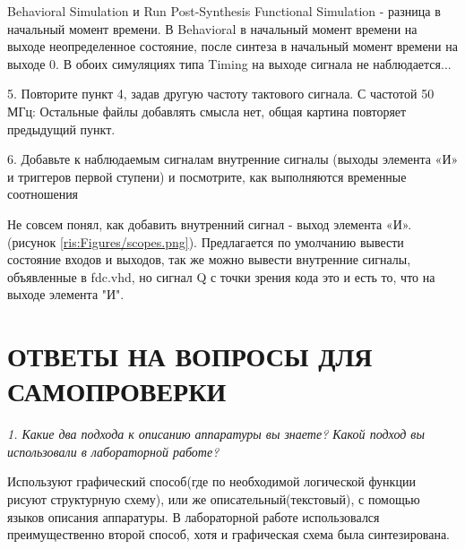 \begin{sloppypar}

Behavioral Simulation и Run Post-Synthesis Functional Simulation - разница в начальный момент времени. В Behavioral в начальный момент времени на выходе  неопределенное состояние, после синтеза в начальный момент времени на выходе 0. В обоих симуляциях типа Timing на выходе сигнала не наблюдается...

5. Повторите пункт 4, задав другую частоту тактового сигнала.
С частотой 50 МГц: 
Остальные файлы добавлять смысла нет, общая картина повторяет предыдущий пункт.

6. Добавьте к наблюдаемым сигналам внутренние сигналы (выходы элемента «И» и триггеров первой ступени) и посмотрите, как выполняются временные соотношения

Не совсем понял, как добавить  внутренний сигнал - выход элемента «И». (рисунок \ref{ris:Figures/scopes.png}). Предлагается по умолчанию вывести состояние входов и выходов, так же можно вывести внутренние сигналы, объявленные в fdc.vhd, но сигнал Q с точки зрения кода это и есть то, что на выходе элемента "И". 





\section*{ОТВЕТЫ НА ВОПРОСЫ ДЛЯ САМОПРОВЕРКИ}

\textit {1. Какие два подхода к описанию аппаратуры вы знаете? Какой подход
вы использовали в лабораторной работе?}

Используют графический способ(где по необходимой логической функции рисуют структурную схему), или же описательный(текстовый), с помощью языков описания аппаратуры. В лабораторной работе использовался преимущественно второй способ, хотя и графическая схема была синтезирована.


\end{sloppypar}
